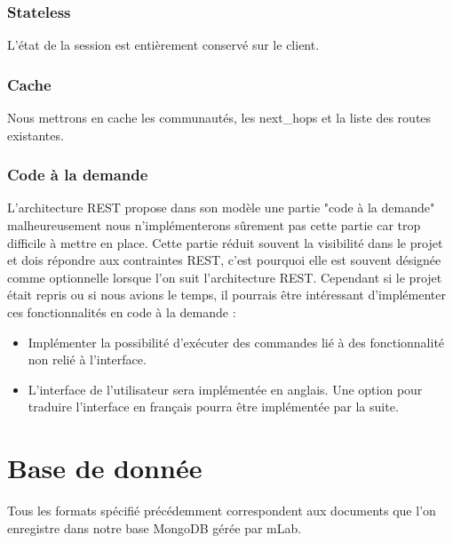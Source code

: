 

\subsubsection{Stateless}
L’état de la session est entièrement conservé sur le client.

\subsubsection{Cache}
Nous mettrons en cache les communautés, les next\_hops et la liste des routes existantes.



\subsubsection{Code à la demande}
L'architecture REST propose dans son modèle une partie "code à la demande" malheureusement nous n'implémenterons sûrement pas cette partie car trop difficile à mettre en place. Cette partie réduit souvent la visibilité dans le projet et dois répondre aux contraintes REST, c'est pourquoi elle est souvent désignée comme optionnelle lorsque l'on suit l'architecture REST. Cependant si le projet était repris ou si nous avions le temps, il pourrais être intéressant d'implémenter ces fonctionnalités en code à la demande :
\begin{itemize}
    \item Implémenter la possibilité d'exécuter des commandes lié à des fonctionnalité non relié à l'interface.
    \item L'interface de l'utilisateur sera implémentée en anglais. Une option pour traduire l'interface en français pourra être implémentée par la suite.
\end{itemize}

\section{Base de donnée}
Tous les formats spécifié précédemment correspondent aux documents que l'on enregistre dans notre base MongoDB gérée par mLab.

